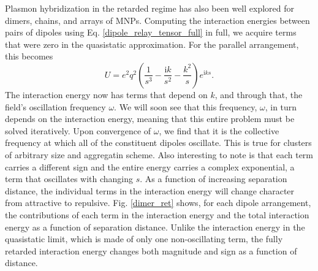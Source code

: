 \documentclass [11pt, proquest] {uwthesis}[2016/11/22]
\begin{document}
Plasmon hybridization in the retarded regime has also been well explored for dimers, chains, and arrays of MNPs. Computing the interaction energies between pairs of dipoles using Eq. \ref{dipole_relay_tensor_full} in full, we acquire terms that were zero in the quasistatic approximation. For the parallel arrangement, this becomes
\begin{equation}
U = e^2q^2\left(\frac{1}{s^3}-\frac{\textrm{i}k}{s^2}-\frac{k^2}{s}\right)e^{\textrm{i}ks}.
\label{int_ret}
\end{equation}
The interaction energy now has terms that depend on $k$, and through that, the field's oscillation frequency $\omega$. We will soon see that this frequency, $\omega$, in turn depends on the interaction energy, meaning that this entire problem must be solved iteratively. Upon convergence of $\omega$, we find that it is the collective frequency at which all of the constituent dipoles oscillate. This is true for clusters of arbitrary size and aggregatin scheme. Also interesting to note is that each term carries a different sign and the entire energy carries a complex exponential, a term that oscillates with changing $s$. As a function of increasing separation distance, the individual terms in the interaction energy will change character from attractive to repulsive. Fig. \ref{dimer_ret} shows, for each dipole arrangement, the contributions of each term in the interaction energy and the total interaction energy as a function of separation distance. Unlike the interaction energy in the quasistatic limit, which is made of only one non-oscillating term, the fully retarded interaction energy changes both magnitude and sign as a function of distance.
\end{document}
